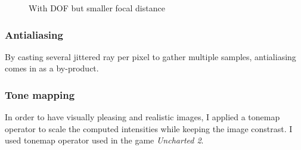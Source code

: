 \documentclass[a4paper,10pt]{article}
\begin{document}
\begin{figure}[!Htb]\centering
    \caption{With DOF but smaller focal distance}
\end{figure}


\subsubsection{Antialiasing}

By casting several jittered ray per pixel to gather multiple samples, antialiasing comes in as a by-product.

\subsubsection{Tone mapping}

In order to have visually pleasing and realistic images, I applied a tonemap operator to scale the computed intensities while keeping the image constrast. I used tonemap operator used in the game \textit{Uncharted 2}.
\end{document}
